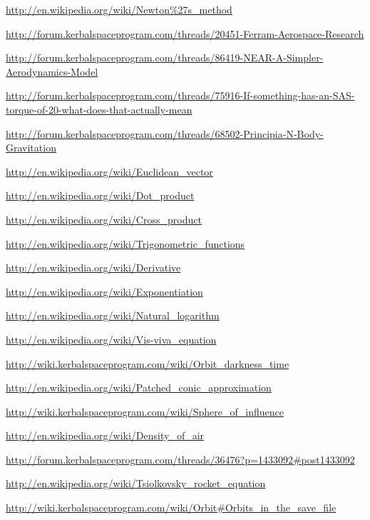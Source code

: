 \documentclass[11pt]{report}
\begin{document}
\begin{thebibliography}{Kerbin}
  \url{http://en.wikipedia.org/wiki/Newton\%27s_method}

  \url{http://forum.kerbalspaceprogram.com/threads/20451-Ferram-Aerospace-Research}

  \url{http://forum.kerbalspaceprogram.com/threads/86419-NEAR-A-Simpler-Aerodynamics-Model}

  \url{http://forum.kerbalspaceprogram.com/threads/75916-If-something-has-an-SAS-torque-of-20-what-does-that-actually-mean}

  \url{http://forum.kerbalspaceprogram.com/threads/68502-Principia-N-Body-Gravitation}

  \url{http://en.wikipedia.org/wiki/Euclidean_vector}

  \url{http://en.wikipedia.org/wiki/Dot_product}

  \url{http://en.wikipedia.org/wiki/Cross_product}

  \url{http://en.wikipedia.org/wiki/Trigonometric_functions}

  \url{http://en.wikipedia.org/wiki/Derivative}

  \url{http://en.wikipedia.org/wiki/Exponentiation}

  \url{http://en.wikipedia.org/wiki/Natural_logarithm}

  \url{http://en.wikipedia.org/wiki/Vis-viva_equation}

  \url{http://wiki.kerbalspaceprogram.com/wiki/Orbit_darkness_time}

  \url{http://en.wikipedia.org/wiki/Patched_conic_approximation}

  \url{http://wiki.kerbalspaceprogram.com/wiki/Sphere_of_influence}

  \url{http://en.wikipedia.org/wiki/Density_of_air}

  \url{http://forum.kerbalspaceprogram.com/threads/36476?p=1433092#post1433092}

  \url{http://en.wikipedia.org/wiki/Tsiolkovsky_rocket_equation}

  \url{http://wiki.kerbalspaceprogram.com/wiki/Orbit#Orbits_in_the_save_file}


\end{thebibliography}
\end{document}
